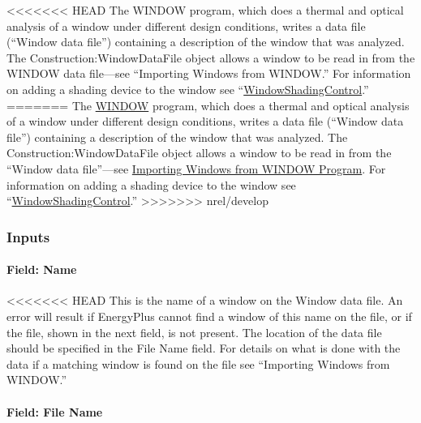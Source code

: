 <<<<<<< HEAD
The WINDOW program, which does a thermal and optical analysis of a window under different design conditions, writes a data file (``Window data file'') containing a description of the window that was analyzed. The Construction:WindowDataFile object allows a window to be read in from the WINDOW data file---see ``Importing Windows from WINDOW.'' For information on adding a shading device to the window see ``\hyperref[windowpropertyshadingcontrol]{WindowShadingControl}.''
=======
The \href{https://windows.lbl.gov/software-tools#window-heading}{WINDOW} program, which does a thermal and optical analysis of a window under different design conditions, writes a data file (``Window data file'') containing a description of the window that was analyzed. The Construction:WindowDataFile object allows a window to be read in from the ``Window data file''---see \hyperref[importing-windows-from-window-program]{Importing Windows from WINDOW Program}. For information on adding a shading device to the window see ``\hyperref[windowpropertyshadingcontrol]{WindowShadingControl}.''
>>>>>>> nrel/develop

\subsubsection{Inputs}\label{inputs-42}

\paragraph{Field: Name}\label{field-name-36}

<<<<<<< HEAD
This is the name of a window on the Window data file. An error will result if EnergyPlus cannot find a window of this name on the file, or if the file, shown in the next field, is not present. The location of the data file should be specified in the File Name field. For details on what is done with the data if a matching window is found on the file see ``Importing Windows from WINDOW.''

\paragraph{Field: File Name}\label{field-file-name-000}


